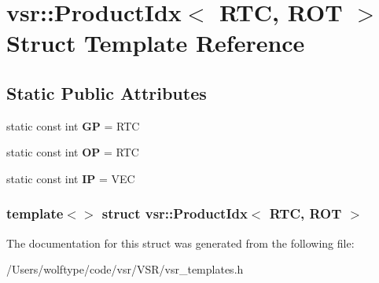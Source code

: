 \hypertarget{structvsr_1_1_product_idx_3_01_r_t_c_00_01_r_o_t_01_4}{\section{vsr\-:\-:Product\-Idx$<$ R\-T\-C, R\-O\-T $>$ Struct Template Reference}
\label{structvsr_1_1_product_idx_3_01_r_t_c_00_01_r_o_t_01_4}
}
\subsection*{Static Public Attributes}
\begin{DoxyCompactItemize}
\item 
\hypertarget{structvsr_1_1_product_idx_3_01_r_t_c_00_01_r_o_t_01_4_a458f3446f1b8a7aece3e5dee2f424a70}{static const int {\bfseries G\-P} = R\-T\-C}\label{structvsr_1_1_product_idx_3_01_r_t_c_00_01_r_o_t_01_4_a458f3446f1b8a7aece3e5dee2f424a70}

\item 
\hypertarget{structvsr_1_1_product_idx_3_01_r_t_c_00_01_r_o_t_01_4_a04278212b45abb68e88ae72fc6e56a38}{static const int {\bfseries O\-P} = R\-T\-C}\label{structvsr_1_1_product_idx_3_01_r_t_c_00_01_r_o_t_01_4_a04278212b45abb68e88ae72fc6e56a38}

\item 
\hypertarget{structvsr_1_1_product_idx_3_01_r_t_c_00_01_r_o_t_01_4_a27d8fedd79fc88e8889fc5cfbdd4e04f}{static const int {\bfseries I\-P} = V\-E\-C}\label{structvsr_1_1_product_idx_3_01_r_t_c_00_01_r_o_t_01_4_a27d8fedd79fc88e8889fc5cfbdd4e04f}

\end{DoxyCompactItemize}
\subsubsection*{template$<$$>$ struct vsr\-::\-Product\-Idx$<$ R\-T\-C, R\-O\-T $>$}



The documentation for this struct was generated from the following file\-:\begin{DoxyCompactItemize}
\item 
/\-Users/wolftype/code/vsr/\-V\-S\-R/vsr\-\_\-templates.\-h\end{DoxyCompactItemize}

